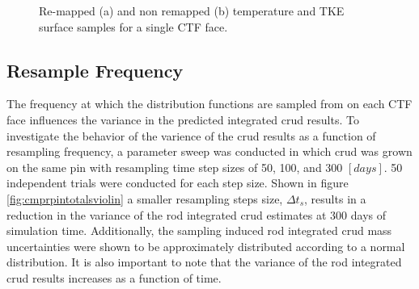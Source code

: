 \begin{figure}[H]%
    \centering
    \hspace*{-1.0em}%
    \caption[Re-mapped and non-remapped temperature and TKE surface samples]{Re-mapped (a) and non remapped (b) temperature and TKE surface samples for a single CTF face.}%
    \label{fig:remmap_comp}%
\end{figure}

\subsection{Resample Frequency}
\label{sec:resample_freq_study}

The frequency at which the distribution functions are sampled from on each CTF face influences the variance in the predicted integrated crud results.  To investigate the behavior of the varience of the crud results as a function of resampling frequency, a parameter sweep was conducted in which crud was grown on the same pin with resampling time step sizes of 50, 100, and 300 $[days]$.  50 independent trials were conducted for each step size.  Shown in figure \ref{fig:cmprpintotalsviolin} a smaller resampling steps size, $\Delta t_s$, results in a reduction in the variance of the rod integrated crud estimates at 300 days of simulation time.   Additionally, the sampling induced rod integrated crud mass uncertainties were shown to be approximately distributed according to a normal distribution.  It is also important to note that the variance of the rod integrated crud results increases as a function of time.

